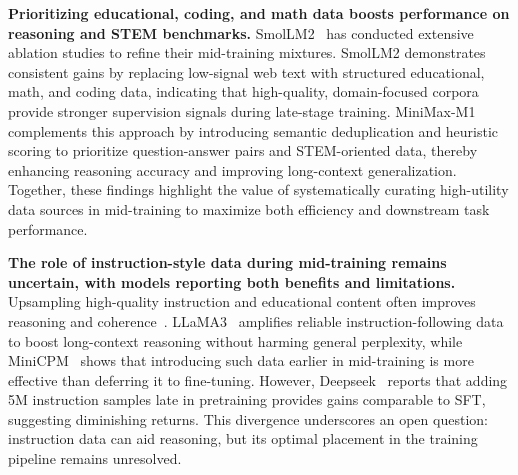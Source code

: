 \noindent\textbf{Prioritizing educational, coding, and math data boosts performance on reasoning and STEM benchmarks.} SmolLM2~\cite{allal2025smollm2} has conducted extensive ablation studies to refine their mid-training mixtures. SmolLM2 demonstrates consistent gains by replacing low-signal web text with structured educational, math, and coding data, indicating that high-quality, domain-focused corpora provide stronger supervision signals during late-stage training. MiniMax-M1 complements this approach by introducing semantic deduplication and heuristic scoring to prioritize question-answer pairs and STEM-oriented data, thereby enhancing reasoning accuracy and improving long-context generalization. Together, these findings highlight the value of systematically curating high-utility data sources in mid-training to maximize both efficiency and downstream task performance.


\noindent\textbf{The role of instruction-style data during mid-training remains uncertain, with models reporting both benefits and limitations.}
Upsampling high-quality instruction and educational content often improves reasoning and coherence~\cite{Dubey2024TheL3, hu2024minicpm}. LLaMA3~\cite{Dubey2024TheL3} amplifies reliable instruction-following data to boost long-context reasoning without harming general perplexity, while MiniCPM~\cite{hu2024minicpm} shows that introducing such data earlier in mid-training is more effective than deferring it to fine-tuning. However, Deepseek~\cite{bi2024deepseek} reports that adding 5M instruction samples late in pretraining provides gains comparable to SFT, suggesting diminishing returns. This divergence underscores an open question: instruction data can aid reasoning, but its optimal placement in the training pipeline remains unresolved.



